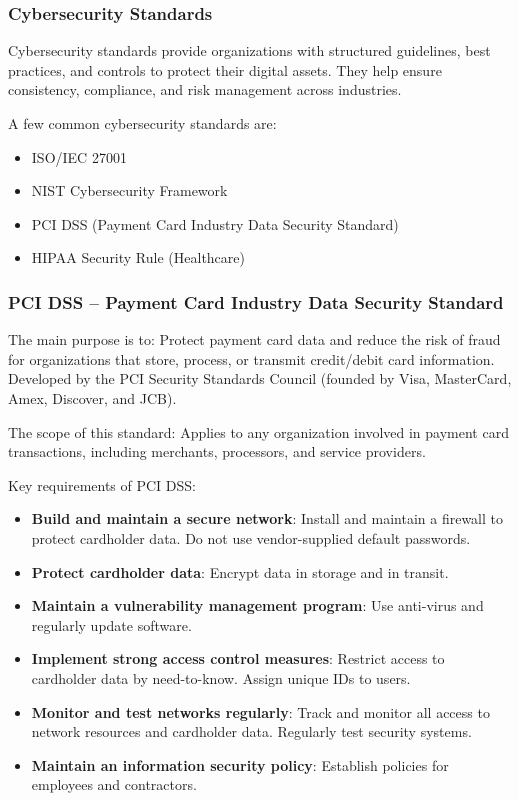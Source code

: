 \subsubsection{Cybersecurity Standards}

\indent 

Cybersecurity standards provide organizations with structured guidelines, best practices, and controls to protect their digital assets. They help ensure consistency, compliance, and risk management across industries.

A few common cybersecurity standards are:

\begin{itemize}
    \item ISO/IEC 27001
    \item NIST Cybersecurity Framework
    \item PCI DSS (Payment Card Industry Data Security Standard)
    \item HIPAA Security Rule (Healthcare)
\end{itemize}

\subsubsection{PCI DSS – Payment Card Industry Data Security Standard}

\indent

The main purpose is to: Protect payment card data and reduce the risk of fraud for organizations that store, process, or transmit credit/debit card information. Developed by the PCI Security Standards Council (founded by Visa, MasterCard, Amex, Discover, and JCB).

The scope of this standard: Applies to any organization involved in payment card transactions, including merchants, processors, and service providers.

Key requirements of PCI DSS:

\begin{itemize}
    \item \textbf{Build and maintain a secure network}: Install and maintain a firewall to protect cardholder data. Do not use vendor-supplied default passwords.
    \item \textbf{Protect cardholder data}: Encrypt data in storage and in transit.
    \item \textbf{Maintain a vulnerability management program}: Use anti-virus and regularly update software.
    \item \textbf{Implement strong access control measures}: Restrict access to cardholder data by need-to-know. Assign unique IDs to users.
    \item \textbf{Monitor and test networks regularly}: Track and monitor all access to network resources and cardholder data. Regularly test security systems.
    \item \textbf{Maintain an information security policy}: Establish policies for employees and contractors.
\end{itemize}

